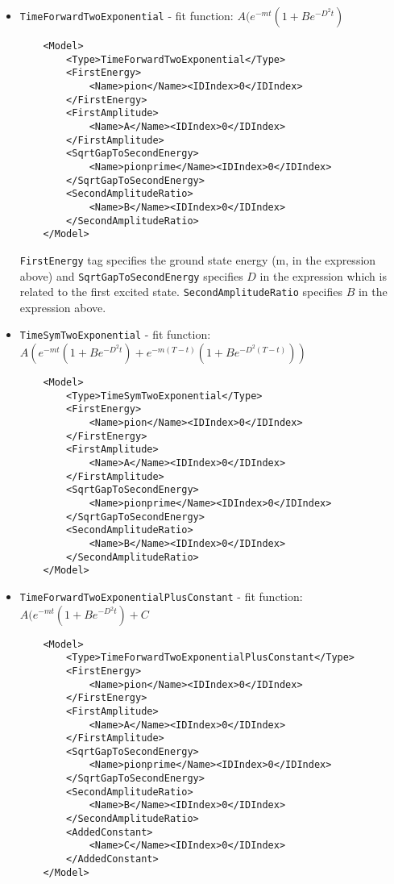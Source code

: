 \documentclass[12pt]{article}
\newcommand{\vb}{\texttt}
\begin{document}
\begin{itemize}
\item \vb{TimeForwardTwoExponential} - fit function: $A(e^{-mt}(1 + B e^{-D^2t})$ 
\begin{verbatim}
    <Model>
        <Type>TimeForwardTwoExponential</Type>
        <FirstEnergy>
            <Name>pion</Name><IDIndex>0</IDIndex>
        </FirstEnergy>
        <FirstAmplitude>
            <Name>A</Name><IDIndex>0</IDIndex>
        </FirstAmplitude>
        <SqrtGapToSecondEnergy>
            <Name>pionprime</Name><IDIndex>0</IDIndex>
        </SqrtGapToSecondEnergy>
        <SecondAmplitudeRatio>
            <Name>B</Name><IDIndex>0</IDIndex>
        </SecondAmplitudeRatio>
    </Model>
\end{verbatim}

\vb{FirstEnergy} tag specifies the ground state energy (m, in the expression above) and \vb{SqrtGapToSecondEnergy} specifies $D$ in the expression which is  related to the first excited state.
\vb{SecondAmplitudeRatio} specifies $B$ in the expression above.

\item \vb{TimeSymTwoExponential} - fit function: $A(e^{-mt}(1 + B e^{-D^2t}) + e^{-m(T-t)}(1 + B e^{-D^2(T-t)}))$
\begin{verbatim}
    <Model>
        <Type>TimeSymTwoExponential</Type>
        <FirstEnergy>
            <Name>pion</Name><IDIndex>0</IDIndex>
        </FirstEnergy>
        <FirstAmplitude>
            <Name>A</Name><IDIndex>0</IDIndex>
        </FirstAmplitude>
        <SqrtGapToSecondEnergy>
            <Name>pionprime</Name><IDIndex>0</IDIndex>
        </SqrtGapToSecondEnergy>
        <SecondAmplitudeRatio>
            <Name>B</Name><IDIndex>0</IDIndex>
        </SecondAmplitudeRatio>
    </Model>
\end{verbatim}

\item \vb{TimeForwardTwoExponentialPlusConstant} - fit function: $A(e^{-mt}(1 + B e^{-D^2t}) + C$
\begin{verbatim}
    <Model>
        <Type>TimeForwardTwoExponentialPlusConstant</Type>
        <FirstEnergy>
            <Name>pion</Name><IDIndex>0</IDIndex>
        </FirstEnergy>
        <FirstAmplitude>
            <Name>A</Name><IDIndex>0</IDIndex>
        </FirstAmplitude>
        <SqrtGapToSecondEnergy>
            <Name>pionprime</Name><IDIndex>0</IDIndex>
        </SqrtGapToSecondEnergy>
        <SecondAmplitudeRatio>
            <Name>B</Name><IDIndex>0</IDIndex>
        </SecondAmplitudeRatio>
        <AddedConstant>
            <Name>C</Name><IDIndex>0</IDIndex>
        </AddedConstant>
    </Model>
\end{verbatim}


\end{itemize}
\end{document}
